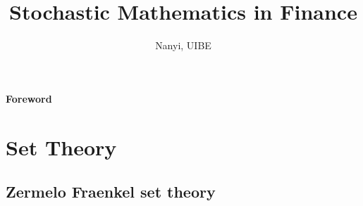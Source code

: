 \documentclass[12pt]{book}
\theoremstyle{definition}
\begin{document}
\title{Stochastic Mathematics in Finance}
\author{Nanyi, UIBE}
\maketitle %





\tableofcontents
\clearpage
{}
{\huge {\bf Foreword}}
\mainmatter

\chapter{Set Theory}

\section{Zermelo Fraenkel set theory}
\end{document}
